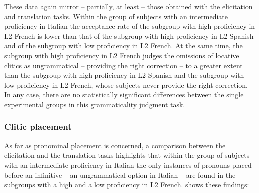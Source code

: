 \documentclass[output=paper,modfonts,nonflat,newtxmath]{langsci/langscibook}
\begin{document}
\begin{table}
\caption{\label{tab:sciutti:5} Judgments on items including an omission of a locative clitic (ungrammatical)}
\end{table}
These data again mirror – partially, at least – those obtained with the elicitation and translation tasks. Within the group of subjects with an intermediate proficiency in Italian the acceptance rate of the subgroup with high proficiency in L2 French is lower than that of the subgroup with high proficiency in L2 Spanish and of the subgroup with low proficiency in L2 French. At the same time, the subgroup with high proficiency in L2 French  judges the omissions of locative clitics as ungrammatical – providing the right correction – to a greater extent than the subgroup with high proficiency in L2 Spanish and the subgroup with low proficiency in L2 French, whose subjects never provide the right correction. In any case, there are no statistically significant differences between the single experimental groups in this grammaticality judgment task.

\subsubsection{Clitic placement} %

As far as pronominal placement is concerned, a comparison between the elicitation and the translation tasks highlights that within the group of subjects with an intermediate proficiency in Italian the only instances of pronouns placed before an infinitive – an ungrammatical option in Italian – are found in the subgroups with a high and a low proficiency in L2 French.  shows these findings:
\end{document}
